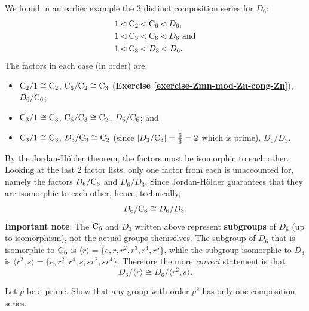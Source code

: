 \newpage

\begin{example}
    We found in an earlier example the 3 distinct composition series for $D_6$:
    \begin{align*}
        &1 \lhd \mathrm{C}_{2} \lhd \mathrm{C}_{6} \lhd D_6,\\
        &1 \lhd \mathrm{C}_{3} \lhd \mathrm{C}_{6} \lhd D_6 \text{ and}\\
        &1 \lhd \mathrm{C}_{3} \lhd D_3 \lhd D_6.
    \end{align*}
    The factors in each case (in order) are:
    \begin{itemize}
        \item $\mathrm{C}_{2}/1 \cong \mathrm{C}_{2}$, $\mathrm{C}_{6}/\mathrm{C}_{2} \cong \mathrm{C}_{3}$ (\textbf{Exercise \ref{exercise-Zmn-mod-Zn-cong-Zn}}), $D_6 / \mathrm{C}_{6}$;
        \item $\mathrm{C}_{3}/1 \cong \mathrm{C}_{3}$, $\mathrm{C}_{6}/\mathrm{C}_{3} \cong \mathrm{C}_{2}$, $D_6 / \mathrm{C}_{6}$; and
        \item $\mathrm{C}_{3}/1 \cong \mathrm{C}_{3}$, $D_3 / \mathrm{C}_{3} \cong \mathrm{C}_{2}$ (since $|D_3 / \mathrm{C}_{3}| = \frac{6}{3} = 2$ which is prime), $D_6 / D_3$.
    \end{itemize}
    By the Jordan-H\"older theorem, the factors must be isomorphic to each other. Looking at the last 2 factor lists, only one factor from each is unaccounted for, namely the factors $D_6 / \mathrm{C}_{6}$ and $D_6 / D_3$. Since Jordan-H\"older guarantees that they are isomorphic to each other, hence, technically,
    \[
            D_6 / \mathrm{C}_{6} \cong D_6 / D_3.
    \]
    \textbf{Important note}: The $\mathrm{C}_{6}$ and $D_3$ written above represent \textbf{subgroups} of $D_6$ (up to isomorphism), not the actual groups themselves. The subgroup of $D_6$ that is isomorphic to $\mathrm{C}_{6}$ is $\langle r \rangle = \{e, r, r^2, r^3, r^4, r^5\}$, while the subgroup isomorphic to $D_3$ is $\langle r^2, s\rangle = \{e, r^2, r^4, s, sr^2, sr^4\}$. Therefore the more \textit{correct} statement is that
    \[
        D_6 / \langle r \rangle \cong D_6 / \langle r^2, s\rangle.
    \]
\end{example}

\begin{exercise}
    Let $p$ be a prime. Show that any group with order $p^2$ has only one composition series.
\end{exercise}
    
\newpage

